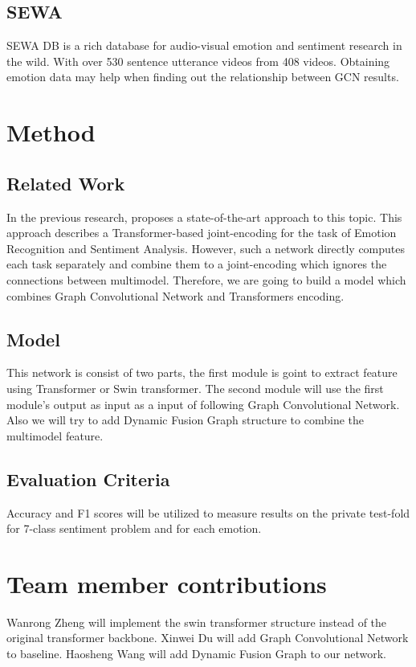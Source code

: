 \documentclass[11pt]{article}
\begin{document}
\subsection{SEWA}
SEWA DB is a rich database for audio-visual emotion and sentiment research in the wild. With over 530 sentence utterance videos from 408 videos. Obtaining emotion data may help when finding out the relationship between GCN results.

\section{Method}
\subsection{Related Work}
In the previous research, \cite{DBLP:journals/corr/abs-2006-15955} proposes a state-of-the-art approach to this topic. This approach describes a Transformer-based\cite{DBLP:journals/corr/VaswaniSPUJGKP17} joint-encoding for the task of Emotion Recognition and Sentiment Analysis. 
However, such a network directly computes each task separately and combine them to a joint-encoding which ignores the connections between multimodel. Therefore, we are going to build a model which combines Graph Convolutional Network\cite{DBLP:journals/corr/KipfW16} and Transformers encoding.

\subsection{Model}
This network is consist of two parts, the first module is goint to extract feature using Transformer or Swin transformer\cite{DBLP:journals/corr/abs-2103-14030}. The second module will use the first module's output as input as a input of following Graph Convolutional Network. Also we will try to add Dynamic Fusion Graph\cite{bagher-zadeh-etal-2018-multimodal} structure to combine the multimodel feature.

\subsection{Evaluation Criteria}
Accuracy and F1 scores will be utilized to measure results on the private test-fold for 7-class sentiment problem and for each emotion.
\section{Team member contributions}
Wanrong Zheng will implement the swin transformer structure instead of the original transformer backbone. Xinwei Du will add Graph Convolutional Network to baseline. Haosheng Wang will add Dynamic Fusion Graph to our network.




\end{document}
